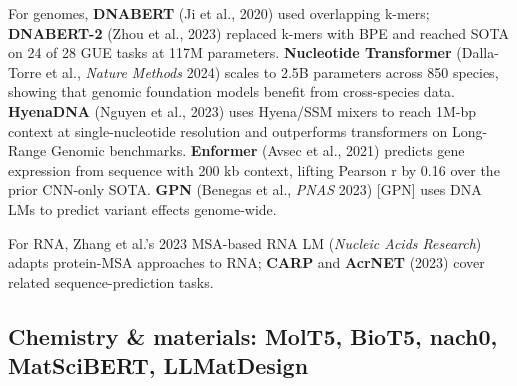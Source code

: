 \documentclass{article}
\begin{document}
For genomes, \textbf{DNABERT} (Ji et al., 2020) \cite{ji2020biorxiv2020} used overlapping k-mers; \textbf{DNABERT-2} (Zhou et al., 2023) \cite{zhou2023arxiv2306150062023} replaced k-mers with BPE and reached SOTA on 24 of 28 GUE tasks at 117M parameters. \textbf{Nucleotide Transformer} (Dalla-Torre et al., \emph{Nature Methods} 2024) \cite{dallatorre2024nucleotidetransfor} scales to 2.5B parameters across 850 species, showing that genomic foundation models benefit from cross-species data. \textbf{HyenaDNA} (Nguyen et al., 2023) \cite{nguyen2023hyenadnalongrangeg} uses Hyena/SSM mixers to reach 1M-bp context at single-nucleotide resolution and outperforms transformers on Long-Range Genomic benchmarks. \textbf{Enformer} (Avsec et al., 2021) \cite{avsec2021effectivegeneexpre} predicts gene expression from sequence with 200 kb context, lifting Pearson r by 0.16 over the prior CNN-only SOTA. \textbf{GPN} (Benegas et al., \emph{PNAS} 2023) {[}GPN{]} uses DNA LMs to predict variant effects genome-wide.

For RNA, Zhang et al.'s 2023 MSA-based RNA LM (\emph{Nucleic Acids Research}) \cite{zhang2023multiplesequenceal} adapts protein-MSA approaches to RNA; \textbf{CARP} and \textbf{AcrNET} (2023) cover related sequence-prediction tasks.

\subsection{Chemistry \& materials: MolT5, BioT5, nach0, MatSciBERT, LLMatDesign}\label{chemistry-materials-molt5-biot5-nach0-matscibert-llmatdesign}
\end{document}
